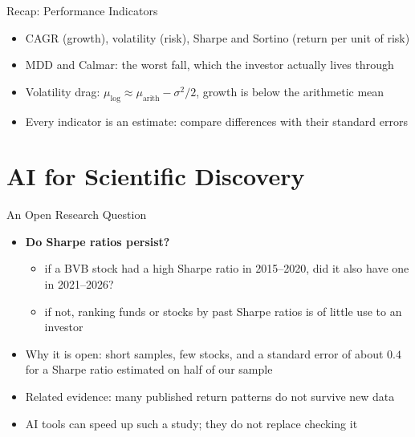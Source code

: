 \begin{frame}{Recap: Performance Indicators}
\itemsize{\small}
\begin{itemize}
    \item CAGR (growth), volatility (risk), Sharpe and Sortino (return per unit of risk)
    \item MDD and Calmar: the worst fall, which the investor actually lives through
    \item Volatility drag: $\mu_{\text{log}} \approx \mu_{\text{arith}} - \sigma^2/2$, growth is below the arithmetic mean
    \item Every indicator is an estimate: compare differences with their standard errors
\end{itemize}
\end{frame}


\section{AI for Scientific Discovery}

\begin{frame}{An Open Research Question}
\itemsize{\small}
\begin{itemize}
    \item \textbf{Do Sharpe ratios persist?}
    \begin{itemize}
        \item if a BVB stock had a high Sharpe ratio in 2015--2020, did it also have one in 2021--2026?
        \item if not, ranking funds or stocks by past Sharpe ratios is of little use to an investor
    \end{itemize}
    \item Why it is open: short samples, few stocks, and a standard error of about $0.4$ for a Sharpe ratio estimated on half of our sample
    \item Related evidence: many published return patterns do not survive new data 
    \item AI tools can speed up such a study; they do not replace checking it 
\end{itemize}
\end{frame}

